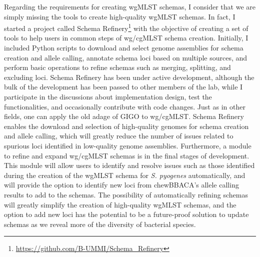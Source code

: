 Regarding the requirements for creating wgMLST schemas, I consider that we are simply missing the tools to create high-quality wgMLST schemas. In fact, I started a project called Schema Refinery\footnote{\url{https://github.com/B-UMMI/Schema_Refinery}} with the objective of creating a set of tools to help users in common steps of wg/cgMLST schema creation. Initially, I included Python scripts to download and select genome assemblies for schema creation and allele calling, annotate schema loci based on multiple sources, and perform basic operations to refine schemas such as merging, splitting, and excluding loci. Schema Refinery has been under active development, although the bulk of the development has been passed to other members of the lab, while I participate in the discussions about implementation design, test the functionalities, and occasionally contribute with code changes. Just as in other fields, one can apply the old adage of \ac{GIGO} to wg/cgMLST. Schema Refinery enables the download and selection of high-quality genomes for schema creation and allele calling, which will greatly reduce the number of issues related to spurious loci identified in low-quality genome assemblies. Furthermore, a module to refine and expand wg/cgMLST schemas is in the final stages of development. This module will allow users to identify and resolve issues such as those identified during the creation of the wgMLST schema for \textit{S. pyogenes} automatically, and will provide the option to identify new loci from chewBBACA's allele calling results to add to the schemas. The possibility of automatically refining schemas will greatly simplify the creation of high-quality wgMLST schemas, and the option to add new loci has the potential to be a future-proof solution to update schemas as we reveal more of the diversity of bacterial species.

